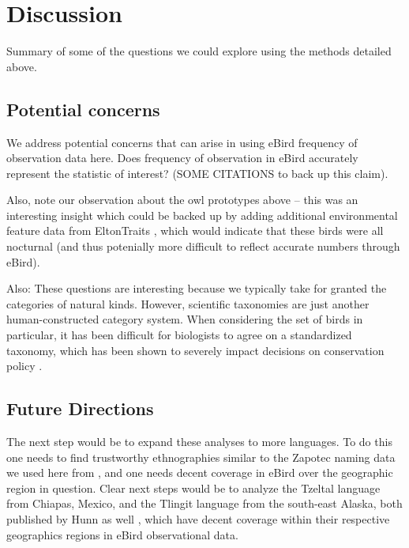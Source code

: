 \documentclass[10pt,letterpaper]{article}
\begin{document}
\section{Discussion}

Summary of some of the questions we could explore using the methods detailed above.

\subsection{Potential concerns}

We address potential concerns that can arise in using eBird frequency of observation data here. Does frequency of observation in eBird accurately represent the statistic of interest? (SOME CITATIONS to back up this claim). 

Also, note our observation about the owl prototypes above -- this was an interesting insight which could be backed up by adding additional environmental feature data from EltonTraits \cite{wilman2014eltontraits}, which would indicate that these birds were all nocturnal (and thus potenially more difficult to reflect accurate numbers through eBird).

Also: These questions are interesting because we typically take for granted the categories of natural kinds. However, scientific taxonomies are just another human-constructed category system. When considering the set of birds in particular, it has been difficult for biologists to agree on a standardized taxonomy, which has been shown to severely impact decisions on conservation policy \cite{peterson2006taxonomy,garnett2017taxonomy}.

\subsection{Future Directions}
The next step would be to expand these analyses to more languages. To do this one needs to find trustworthy ethnographies similar to the Zapotec naming data we used here from , and one needs decent coverage in eBird over the geographic region in question. Clear next steps would be to analyze the Tzeltal language from Chiapas, Mexico, and the Tlingit language from the south-east Alaska, both published by Hunn as well \cite{hunn1977tzeltal,hunn2012tlingit}, which have decent coverage within their respective geographics regions in eBird observational data. 
\end{document}
